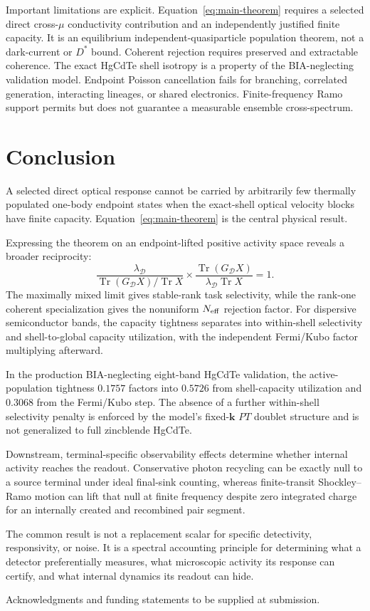 \documentclass[aps,twocolumn,superscriptaddress,longbibliography]{revtex4-2}
\newcommand{\Tr}{\operatorname{Tr}}
\newcommand{\cD}{\mathcal D}
\begin{document}
Important limitations are explicit. Equation~\eqref{eq:main-theorem} requires a selected direct cross-$\mu$ conductivity contribution and an independently justified finite capacity. It is an equilibrium independent-quasiparticle population theorem, not a dark-current or $D^*$ bound. Coherent rejection requires preserved and extractable coherence. The exact HgCdTe shell isotropy is a property of the BIA-neglecting validation model. Endpoint Poisson cancellation fails for branching, correlated generation, interacting lineages, or shared electronics. Finite-frequency Ramo support permits but does not guarantee a measurable ensemble cross-spectrum.

\section{Conclusion}

A selected direct optical response cannot be carried by arbitrarily few thermally populated one-body endpoint states when the exact-shell optical velocity blocks have finite capacity. Equation~\eqref{eq:main-theorem} is the central physical result.

Expressing the theorem on an endpoint-lifted positive activity space reveals a broader reciprocity:
\begin{equation}
\boxed{
\frac{\lambda_{\cD}}{\Tr(G_{\cD}X)/\Tr X}
\times
\frac{\Tr(G_{\cD}X)}{\lambda_{\cD}\Tr X}=1.}
\end{equation}
The maximally mixed limit gives stable-rank task selectivity, while the rank-one coherent specialization gives the nonuniform $N_{\rm eff}$ rejection factor. For dispersive semiconductor bands, the capacity tightness separates into within-shell selectivity and shell-to-global capacity utilization, with the independent Fermi/Kubo factor multiplying afterward.

In the production BIA-neglecting eight-band HgCdTe validation, the active-population tightness $0.1757$ factors into $0.5726$ from shell-capacity utilization and $0.3068$ from the Fermi/Kubo step. The absence of a further within-shell selectivity penalty is enforced by the model's fixed-$\bm k$ $PT$ doublet structure and is not generalized to full zincblende HgCdTe.

Downstream, terminal-specific observability effects determine whether internal activity reaches the readout. Conservative photon recycling can be exactly null to a source terminal under ideal final-sink counting, whereas finite-transit Shockley--Ramo motion can lift that null at finite frequency despite zero integrated charge for an internally created and recombined pair segment.

The common result is not a replacement scalar for specific detectivity, responsivity, or noise. It is a spectral accounting principle for determining what a detector preferentially measures, what microscopic activity its response can certify, and what internal dynamics its readout can hide.

\begin{acknowledgments}
Acknowledgments and funding statements to be supplied at submission.
\end{acknowledgments}


\end{document}
